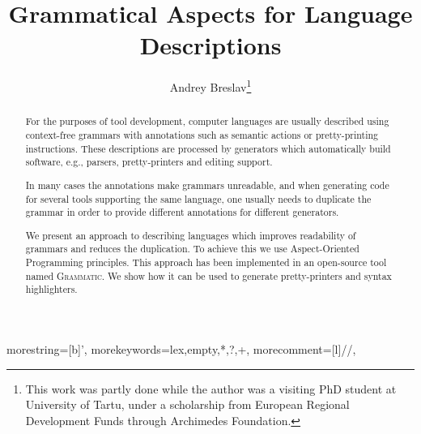 \documentclass[10pt]{llncs}
\newcommand{\tool}[1]{\textsc{#1}}
\newcommand{\Grammatic}[0]{\tool{Grammatic}}
\begin{document}
	{
		morestring=[b]',
		morekeywords={lex,empty,*,?,+},
		morecomment=[l]{//},
	}

\title{Grammatical Aspects for Language Descriptions}
\author{Andrey Breslav\thanks{This work was partly done while the author was a visiting PhD student at University of Tartu, under a scholarship from European Regional Development Funds through Archimedes Foundation.}}
\date{}

\maketitle

\begin{abstract}
	For the purposes of tool development, computer languages are usually described using context-free grammars with annotations such as semantic actions or pretty-printing instructions. 
	These descriptions are processed by generators which automatically build software, e.g., parsers, pretty-printers and editing support.

	In many cases the annotations make grammars unreadable, and when generating code for several tools supporting the same language, one usually needs to duplicate the grammar in order to provide different annotations for different generators.

	We present an approach to describing languages which improves readability of grammars and reduces the duplication. To achieve this we use Aspect-Oriented Programming principles. This approach has been implemented in an open-source tool named \Grammatic{}. We show how it can be used to generate pretty-printers and syntax highlighters.
\end{abstract}

\end{document}
